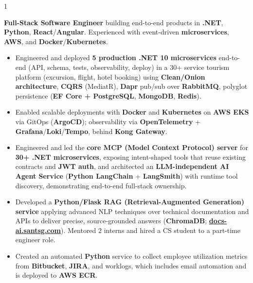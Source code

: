 \documentclass[11pt,a4paper]{altacv}
\makeatletter
\renewcommand{\namefont}{\LARGE\bfseries}
\renewcommand{\taglinefont}{\normalsize\bfseries}
\renewcommand{\personalinfofont}{\footnotesize}
\renewcommand{\makecvheader}{%
  \begingroup
    \begin{minipage}{\linewidth}%
    \raggedright%
    {\namefont\color{name}\MakeUppercase{\@name}\par}
    \smallskip
    {\taglinefont\color{tagline}\@tagline\par}
    \smallskip
    {\personalinfofont\@personalinfo\par}
    \end{minipage}\par%
  \endgroup
}
\makeatother
\begin{document}


\begin{fullwidth}
\makecvheader
\end{fullwidth}

\begin{paracol}{1}

\textbf{Full-Stack Software Engineer} building end-to-end products in \textbf{.NET}, \textbf{Python}, \textbf{React}/\textbf{Angular}. Experienced with event-driven \textbf{microservices}, \textbf{AWS}, and \textbf{Docker}/\textbf{Kubernetes}.


\begin{itemize}
  \item Engineered and deployed \textbf{5 production .NET 10 microservices} end-to-end (API, schema, tests, observability, deploy) in a 30+ service tourism platform (excursion, flight, hotel booking) using \textbf{Clean/Onion architecture}, \textbf{CQRS} (MediatR), \textbf{Dapr} pub/sub over \textbf{RabbitMQ}, polyglot persistence (\textbf{EF Core + PostgreSQL}, \textbf{MongoDB}, \textbf{Redis}).
  \item Enabled scalable deployments with \textbf{Docker} and \textbf{Kubernetes} on \textbf{AWS EKS} via GitOps (\textbf{ArgoCD}); observability via \textbf{OpenTelemetry} + \textbf{Grafana}/\textbf{Loki}/\textbf{Tempo}, behind \textbf{Kong Gateway}.
  \item Engineered and led the \textbf{core MCP (Model Context Protocol) server} for \textbf{30+ .NET microservices}, exposing intent-shaped tools that reuse existing contracts and \textbf{JWT auth}, and architected an \textbf{LLM-independent AI Agent Service} (\textbf{Python LangChain} + \textbf{LangSmith}) with runtime tool discovery, demonstrating end-to-end full-stack ownership.
  \item Developed a \textbf{Python/Flask RAG (Retrieval-Augmented Generation) service} applying advanced NLP techniques over technical documentation and APIs to deliver precise, source-grounded answers (\textbf{ChromaDB}; \href{https://docs-ai.santsg.com}{\textbf{docs-ai.santsg.com}}). Mentored 2 interns and hired a CS student to a part-time engineer role.
  \item Created an automated \textbf{Python} service to collect employee utilization metrics from \textbf{Bitbucket}, \textbf{JIRA}, and worklogs, which includes email automation and is deployed to \textbf{AWS ECR}.
\end{itemize}


\end{paracol}
\end{document}
